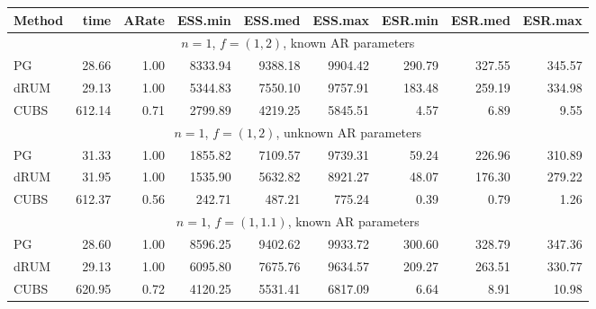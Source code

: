 \documentclass[11pt]{article}
\begin{document}
\begin{table}
\small
\centering
\begin{tabular}{l r r r r r r r r } 
         Method  &    time  &   ARate  &  ESS.min  &  ESS.med  &  ESS.max  & ESR.min  &  ESR.med  &  ESR.max  \\ 

\hline
\hline
 \multicolumn{9}{c}{$n=1$, $f = (1,2)$, known AR parameters} \\
\hline
             PG   &    28.66 &     1.00 &   8333.94 &   9388.18 &   9904.42 &    290.79 &    327.55 &    345.57 \\ 
           dRUM   &    29.13 &     1.00 &   5344.83 &   7550.10 &   9757.91 &    183.48 &    259.19 &    334.98 \\ 
           CUBS   &   612.14 &     0.71 &   2799.89 &   4219.25 &   5845.51 &      4.57 &      6.89 &      9.55
\\ %

\hline
 \multicolumn{9}{c}{$n=1$, $f = (1,2)$, unknown AR parameters} \\
\hline
             PG   &    31.33 &     1.00 &   1855.82 &   7109.57 &   9739.31 &     59.24 &    226.96 &    310.89 \\ 
           dRUM   &    31.95 &     1.00 &   1535.90 &   5632.82 &   8921.27 &     48.07 &    176.30 &    279.22 \\ 
           CUBS   &   612.37 &     0.56 &    242.71 &    487.21 &    775.24 &      0.39 &      0.79 &      1.26
 \\ %

\hline
\multicolumn{9}{c}{$n=1$, $f = (1,1.1)$, known AR parameters} \\
\hline
             PG   &    28.60 &     1.00 &   8596.25 &   9402.62 &   9933.72 &    300.60 &    328.79 &    347.36 \\ 
           dRUM   &    29.13 &     1.00 &   6095.80 &   7675.76 &   9634.57 &    209.27 &    263.51 &    330.77 \\ 
           CUBS   &   620.95 &     0.72 &   4120.25 &   5531.41 &   6817.09 &      6.64 &      8.91 &     10.98
 \\ %



\end{tabular}
\end{table}
\end{document}
